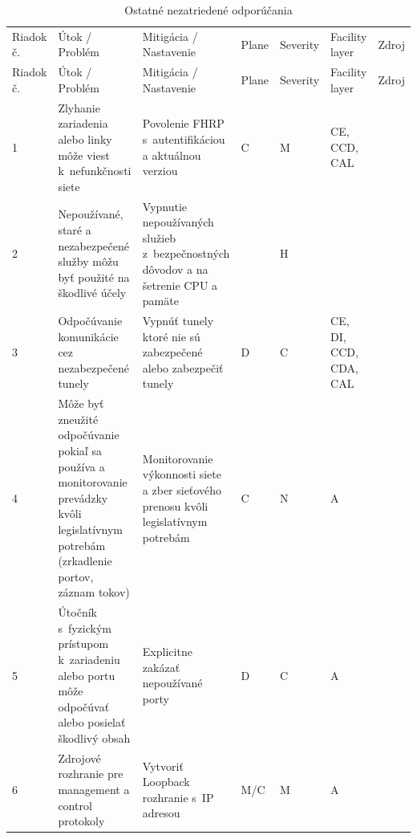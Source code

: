 \begin{longtable}[!htbp]{|C{2.5em}L{11em}L{11em}C{2.5em}C{4em}C{5em}L{2.5em}|}
	
	\caption{Ostatné nezatriedené odporúčania}
	\label{tab:other}\\ \hline
	\mbox{Riadok} č.&Útok / Problém	&Mitigácia / Nastavenie	&Plane	&Severity	&Facility layer	&Zdroj\\ \hhline{=======}
	\endfirsthead 
	\hline
	\centering
	
	Riadok č.	&Útok / Problém	&Mitigácia / Nastavenie	&Plane	&Severity	&Facility layer	&Zdroj\\ \hhline{=======}
	\endhead
	
	 1	&Zlyhanie zariadenia alebo linky môže viest k~nefunkčnosti siete 	&Povolenie FHRP s~autentifikáciou a aktuálnou verziou	&C	&M	&CE,
	CCD,
	CAL	& \cite{Lammle2013}\\
	2	&Nepoužívané, staré a nezabezpečené služby môžu byť použité na škodlivé účely	&Vypnutie nepoužívaných služieb z~bezpečnostných dôvodov a na šetrenie CPU a pamäte 	& {\normalsize*}\footnotemark &H	&{\normalsize*}\footnotemark[\value{footnote}] & \cite{yDzYjF1hoACahpg1}\\
	 3	&Odpočúvanie komunikácie  cez nezabezpečené tunely	&Vypnúť tunely ktoré nie sú zabezpečené alebo zabezpečiť tunely	&D	&C	&CE, DI, CCD, CDA, CAL	& \cite{CIS_DrTLsgXv24lxeIIM}
	
	\cite{Hucaby2010}\\
	4	&Môže byť zneužité odpočúvanie pokiaľ sa používa a monitorovanie prevádzky kvôli legislatívnym potrebám (zrkadlenie portov, záznam tokov)&Monitorovanie výkonnosti siete a zber sieťového prenosu kvôli legislatívnym potrebám	&C	&N	&A	& \cite{Singh2018}\\
	 5	&Útočník s~fyzickým prístupom k~zariadeniu alebo portu môže odpočúvať alebo posielať škodlivý obsah	&Explicitne zakázať nepoužívané porty	&D	&C	&A	& \cite{Graesser2001}
	
	\cite{Jackson2010}\\
	6	&Zdrojové rozhranie pre management a control protokoly	&Vytvoriť Loopback rozhranie s~IP adresou	&M/C	&M	&A	&
	\cite{Singh2018}
	

\end{longtable}
